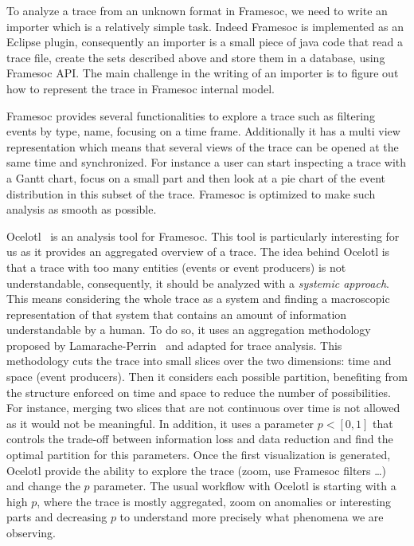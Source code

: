 To analyze a trace from an unknown format in \gls{Framesoc}, we need to write an importer which is a relatively simple task.
Indeed \gls{Framesoc} is implemented as an Eclipse plugin, consequently an importer is a small piece of java code that read a trace file, create the sets described above and store them in a database, using \gls{Framesoc} \gls{API}.
The main challenge in the writing of an importer is to figure out how to represent the trace in \gls{Framesoc} internal model.

\gls{Framesoc} provides several functionalities to explore a trace such as filtering events by type, name, focusing on a time frame.
Additionally it has a multi view representation which means that several views of the trace can be opened at the same time and synchronized.
For instance a user can start inspecting a trace with a Gantt chart, focus on a small part and then look at a pie chart of the event distribution in this subset of the trace.
\gls{Framesoc} is optimized to make such analysis as smooth as possible.

\gls{Ocelotl}~\cite{Dosimont14Ocelotl} is an analysis tool for \gls{Framesoc}.
This tool is particularly interesting for us as it provides an aggregated overview of a trace.
The idea behind \gls{Ocelotl} is that a trace with too many entities (events or event producers) is not understandable, consequently, it should be analyzed with a \emph{systemic approach}.
This means considering the whole trace as a system and finding a macroscopic representation of that system that contains an amount of information understandable by a human.
To do so, it uses an aggregation methodology proposed by Lamarache-Perrin~\cite{Lamarche_Perrin14Agregation} and adapted for trace analysis.
This methodology cuts the trace into small slices over the two dimensions: time and space (event producers).
Then it considers each possible partition, benefiting from the structure enforced on time and space to reduce the number of possibilities.
For instance, merging two slices that are not continuous over time is not allowed as it would not be meaningful.
In addition, it uses a parameter $p<[0,1]$ that controls the trade-off between information loss and data reduction and find the optimal partition for this parameters.
Once the first visualization is generated, \gls{Ocelotl} provide the ability to explore the trace (zoom, use \gls{Framesoc} filters \ldots) and change the $p$ parameter.
The usual workflow with \gls{Ocelotl} is starting with a high $p$, where the trace is mostly aggregated, zoom on anomalies or interesting parts and decreasing $p$ to understand more precisely what phenomena we are observing.

